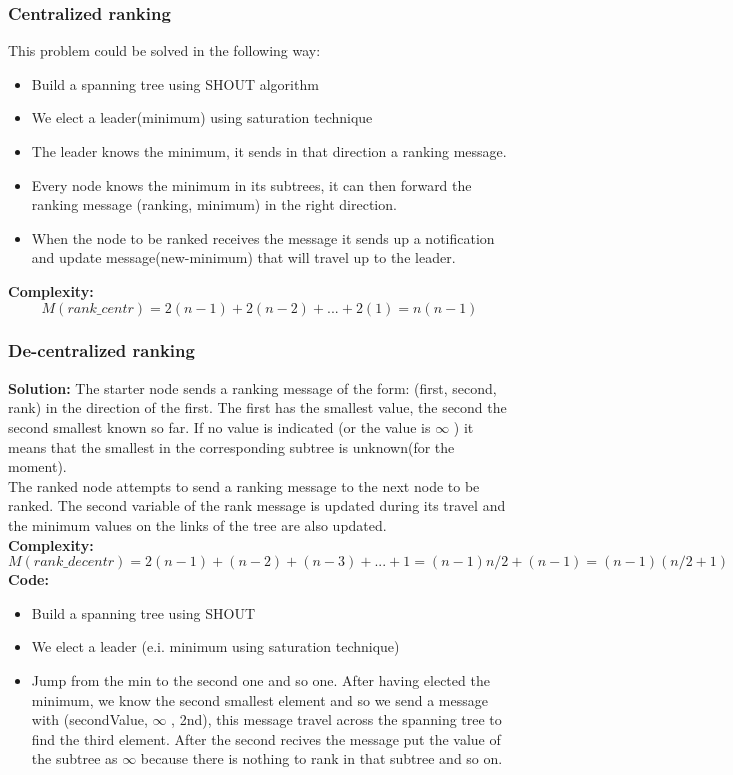 \documentclass[paper=a4, fontsize=11pt]{scrartcl} %
\numberwithin{equation}{section} %
\numberwithin{figure}{section} %
\numberwithin{table}{section} %
\begin{document}
\subsubsection*{Centralized ranking}
This problem could be solved in the following way:\\
\begin{itemize}
\item Build a spanning tree using SHOUT algorithm
\item We elect a leader(minimum) using saturation technique
\item The leader knows the minimum, it sends in that direction a ranking message.
\item Every node knows the minimum in its subtrees, it can then forward the ranking message (ranking, minimum) in the right direction.
\item When the node to be ranked receives the message it sends up a notification and update message(new-minimum) that will travel up to the leader.
\end{itemize}
\textbf{Complexity:} $$M(rank\_centr) = 2(n-1)+ 2(n-2)+ ... + 2(1)= n(n-1)$$ 
\subsubsection*{De-centralized ranking}
\textbf{Solution:} The starter node sends a ranking message of the form: (first, second, rank) in the direction of the first. The first has the smallest value, the second the second smallest known so far. If no value is indicated (or the value is $\infty$ ) it means that the smallest in the corresponding subtree is unknown(for the moment).\\
The ranked node attempts to send a ranking message to the next node to be ranked. The second variable of the rank message is updated during its travel and the minimum values on the links of the tree are also updated.\\
\textbf{Complexity:} $$M(rank\_decentr) = 2(n-1)+ (n-2)+ (n-3)+ ...+ 1= (n-1)n/2+ (n-1)= (n-1)(n/2+1)$$
\textbf{Code:}
\begin{itemize}
\item Build a spanning tree using SHOUT
\item We elect a leader (e.i. minimum using saturation technique)
\item Jump from the min to the second one and so one. After having elected the minimum, we know the second smallest element and so we send a message with (secondValue, $\infty$ , 2nd), this message travel across the spanning tree to find the third element. After the second recives the message put the value of the subtree as $\infty$ because there is nothing to rank in that subtree and so on. 
\end{itemize}
\end{document}
